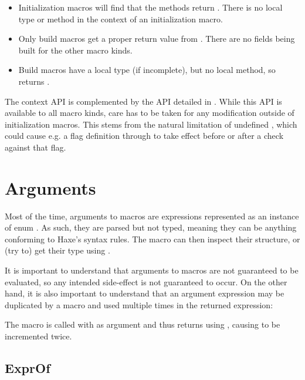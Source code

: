 \documentclass{haxe}
\begin{document}
\begin{itemize}
	\item Initialization macros will find that the  methods return . There is no local type or method in the context of an initialization macro.
	\item Only build macros get a proper return value from . There are no fields being built for the other macro kinds.
	\item Build macros have a local type (if incomplete), but no local method, so  returns .
\end{itemize}

The context API is complemented by the  API detailed in . While this API is available to all macro kinds, care has to be taken for any modification outside of initialization macros. This stems from the natural limitation of undefined , which could cause e.g. a flag definition through  to take effect before or after a  check against that flag.

\section{Arguments}
\label{macro-arguments}

Most of the time, arguments to macros are expressions represented as an instance of enum . As such, they are parsed but not typed, meaning they can be anything conforming to Haxe's syntax rules. The macro can then inspect their structure, or (try to) get their type using .

It is important to understand that arguments to macros are not guaranteed to be evaluated, so any intended side-effect is not guaranteed to occur. On the other hand, it is also important to understand that an argument expression may be duplicated by a macro and used multiple times in the returned expression:


The macro  is called with  as argument and thus returns  using , causing  to be incremented twice.

\subsection{ExprOf}
\label{macro-ExprOf}
\end{document}
